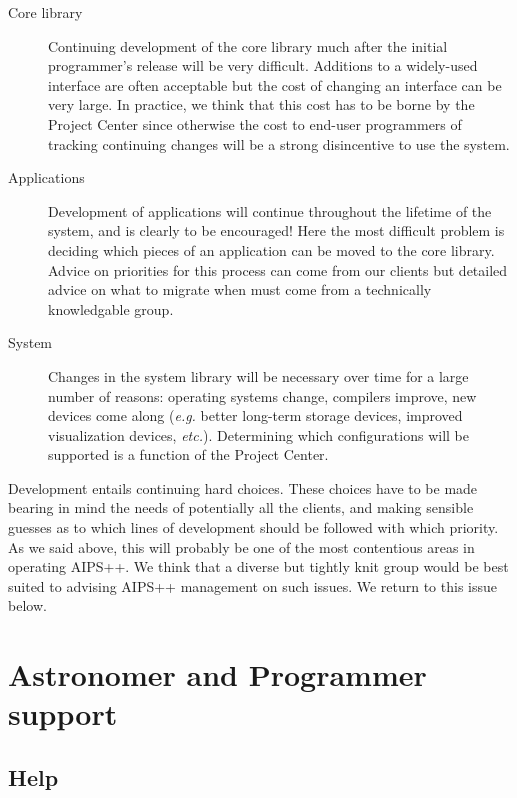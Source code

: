 \begin{description}
\item[Core library] Continuing development of the core library
much after the initial programmer's release will be very difficult.
Additions to a widely-used interface are often acceptable but the cost
of changing an interface can be very large. In practice, we think that
this cost has to be borne by the Project Center since otherwise the
cost to end-user programmers of tracking continuing changes will be a
strong disincentive to use the system.
\item[Applications] Development of applications will continue
throughout the lifetime of the system, and is clearly to be 
encouraged! Here the most difficult problem is deciding which 
pieces of an application can be moved to the core library.
Advice on priorities for this process can come from our clients
but detailed advice on what to migrate when must come from a
technically knowledgable group.
\item[System] Changes in the system library will be necessary over
time for a large number of reasons: operating systems change,
compilers improve, new devices come along ({\em e.g.} better long-term storage
devices, improved visualization devices, {\em etc.}). Determining which
configurations will be supported is a function of the Project Center.
\end{description}

Development entails continuing hard choices. These choices have to be
made bearing in mind the needs of potentially all the clients, and
making sensible guesses as to which lines of development should be
followed with which priority. As we said above, this will probably be
one of the most contentious areas in operating AIPS++. We think that a
diverse but tightly knit group would be best suited to advising AIPS++
management on such issues.  We return to this issue below.

\section{Astronomer and Programmer support}

\subsection{Help}

